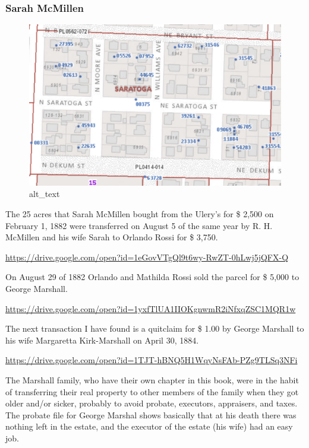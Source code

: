 \documentclass[
  12pt,
]{book}
\begin{document}
\hypertarget{sarah-mcmillen}{%
\subsubsection{Sarah McMillen}\label{sarah-mcmillen}}

\begin{figure}
\centering
\includegraphics{images/0202a_images/image7.png}
\caption{alt\_text}
\end{figure}

The 25 acres that Sarah McMillen bought from the Ulery's for \$ 2,500 on February 1, 1882 were transferred on August 5 of the same year by R. H. McMillen and his wife Sarah to Orlando Rossi for \$ 3,750.

\url{https://drive.google.com/open?id=1eGovVTgQl9t6wy-RwZT-0hLwj5jQFX-Q}

On August 29 of 1882 Orlando and Mathilda Rossi sold the parcel for \$ 5,000 to George Marshall.

\url{https://drive.google.com/open?id=1yxfTlUA1IIOKgnwmR2iNfxqZSC1MQR1w}

The next transaction I have found is a quitclaim for \$ 1.00 by George Marshall to his wife Margaretta Kirk-Marshall on April 30, 1884.

\url{https://drive.google.com/open?id=1TJT-hBNQ5H1WqyNsFAb-PZg9TLSq3NFi}

The Marshall family, who have their own chapter in this book, were in the habit of transferring their real property to other members of the family when they got older and/or sicker, probably to avoid probate, executors, appraisers, and taxes. The probate file for George Marshal shows basically that at his death there was nothing left in the estate, and the executor of the estate (his wife) had an easy job.
\end{document}
